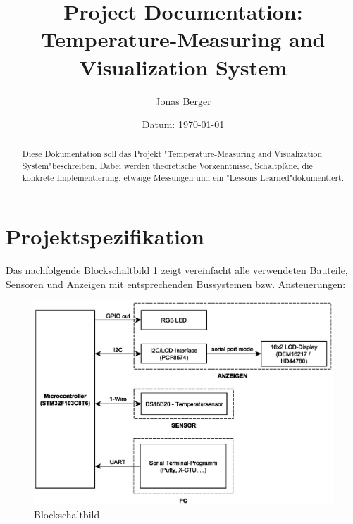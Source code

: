 \documentclass[12pt,a4paper]{article}
\newcommand{\titlepicture}[2][]{%
	\renewcommand\placetitlepicture{%
		\texttt{[image: \#2]}\par\medskip
	}%
}
\newcommand{\placetitlepicture}{} %
\begin{document}
\title{Project Documentation: \\ Temperature-Measuring and Visualization System}
\author{Jonas Berger}
\date{Datum: \today}
\titlepicture[width=0.9\linewidth]{title_img}

\maketitle

\thispagestyle{empty}
\pagebreak

\renewcommand{\abstractname}{Abstract}
\begin{abstract}
	\noindent
	Diese Dokumentation soll das  Projekt "Temperature-Measuring and Visualization System"\space beschreiben.
	Dabei werden theoretische Vorkenntnisse, Schaltpläne, die konkrete Implementierung, etwaige Messungen und ein "Lessons Learned"\space dokumentiert.
\end{abstract}

\tableofcontents
\pagebreak

\section{Projektspezifikation}
 Das nachfolgende Blockschaltbild \ref{figure:blockschaltbild} zeigt vereinfacht alle verwendeten Bauteile, Sensoren und Anzeigen mit entsprechenden Bussystemen bzw. Ansteuerungen:

\begin{figure}[H]
	\centering
	\includegraphics[width=1\linewidth]{Project_Mockup_V05}
	\caption{Blockschaltbild}
	\label{figure:blockschaltbild}
\end{figure}
\end{document}
